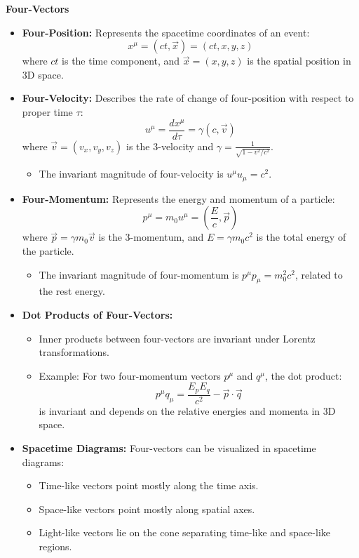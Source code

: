 \documentclass{article}
\newcommand{\conceptbox}[1]{\begin{tcolorbox}[colback=blue!10] #1 \end{tcolorbox}}
\begin{document}
\conceptbox{
\textbf{Four-Vectors}
\begin{itemize}
    \item \textbf{Four-Position:} Represents the spacetime coordinates of an event:
    \[
    x^\mu = (ct, \vec{x}) = (ct, x, y, z)
    \]
    where $ct$ is the time component, and $\vec{x} = (x, y, z)$ is the spatial position in 3D space.

    \item \textbf{Four-Velocity:} Describes the rate of change of four-position with respect to proper time $\tau$:
    \[
    u^\mu = \frac{dx^\mu}{d\tau} = \gamma(c, \vec{v})
    \]
    where $\vec{v} = (v_x, v_y, v_z)$ is the 3-velocity and $\gamma = \frac{1}{\sqrt{1 - v^2/c^2}}$.
    \begin{itemize}
        \item The invariant magnitude of four-velocity is $u^\mu u_\mu = c^2$.
    \end{itemize}

    \item \textbf{Four-Momentum:} Represents the energy and momentum of a particle:
    \[
    p^\mu = m_0 u^\mu = (\frac{E}{c}, \vec{p})
    \]
    where $\vec{p} = \gamma m_0 \vec{v}$ is the 3-momentum, and $E = \gamma m_0 c^2$ is the total energy of the particle.
    \begin{itemize}
        \item The invariant magnitude of four-momentum is $p^\mu p_\mu = m_0^2 c^2$, related to the rest energy.
    \end{itemize}

    \item \textbf{Dot Products of Four-Vectors:}
    \begin{itemize}
        \item Inner products between four-vectors are invariant under Lorentz transformations.
        \item Example: For two four-momentum vectors $p^\mu$ and $q^\mu$, the dot product:
        \[
        p^\mu q_\mu = \frac{E_p E_q}{c^2} - \vec{p} \cdot \vec{q}
        \]
        is invariant and depends on the relative energies and momenta in 3D space.
    \end{itemize}

    \item \textbf{Spacetime Diagrams:} Four-vectors can be visualized in spacetime diagrams:
    \begin{itemize}
        \item Time-like vectors point mostly along the time axis.
        \item Space-like vectors point mostly along spatial axes.
        \item Light-like vectors lie on the cone separating time-like and space-like regions.
    \end{itemize}
\end{itemize}
}
\end{document}
